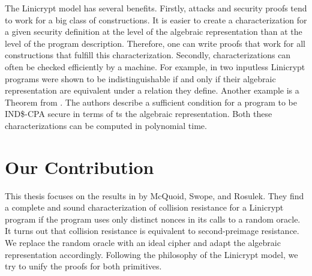 The Linicrypt model has several benefits.
Firstly, attacks and security proofs tend to work for a big class of constructions.
It is easier to create a characterization for a given security definition at the level of the algebraic representation than at the level of the program description. 
Therefore, one can write proofs that work for all constructions that fulfill this characterization.
Secondly, characterizations can often be checked efficiently by a machine.
For example, in \cite{C:CarRos16} two inputless Linicrypt programs were shown to be indistinguishable if and only if their algebraic representation are equivalent under a relation they define.
Another example is a Theorem from \cite{EPRINT:HolRosRoy22}.
The authors describe a sufficient condition for a program to be IND\$-CPA secure in terms of ts the algebraic representation.
Both these characterizations can be computed in polynomial time.

\section{Our Contribution}

This thesis focuses on the results in \cite{TCC:McQSwoRos19} by McQuoid, Swope, and Rosulek.
They find a complete and sound characterization of collision resistance for a Linicrypt program
if the program uses only distinct nonces in its calls to a random oracle.
It turns out that collision resistance is equivalent to second-preimage resistance.
We replace the random oracle with an ideal cipher and adapt the algebraic representation accordingly.
Following the philosophy of the Linicrypt model,
we try to unify the proofs for both primitives.



